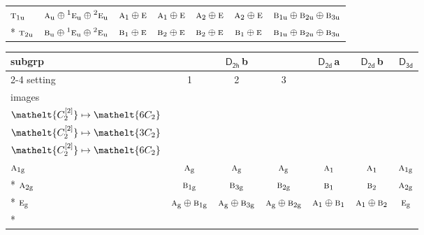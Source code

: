 \documentclass[10pt,a4paper]{article}
\numberwithin{equation}{section}
\newcommand{\eltfont}[1]{{\let\sigma\eltsigma\mathelt{#1}}}
\newcommand{\grp}[1]{\mathsf{#1}}
\newcommand{\irr}[1]{\text{\normalfont\scshape #1}}
\newcommand{\conjpair}[1]{{}^{#1}}
\newcommand{\cls}[1]{\eltfont{#1}}
\newcommand{\ptag}[1]{\mathrm{#1}}
\newcommand{\clsletter}[1]{\,{\scriptsize\color{black!55}#1}}
\newcommand{\genidx}[2]{#1^{[\mathrm{#2}]}}
\begin{document}
{\begin{longtable}{@{}lcccccc@{}}
$\irr{t}_{1\ptag{u}}$ & $\irr{a}_{\ptag{u}}\oplus \conjpair{1}\irr{e}_{\ptag{u}}\oplus \conjpair{2}\irr{e}_{\ptag{u}}$ & $\irr{a}_{1}\oplus \irr{e}$ & $\irr{a}_{1}\oplus \irr{e}$ & $\irr{a}_{2}\oplus \irr{e}$ & $\irr{a}_{2}\oplus \irr{e}$ & $\irr{b}_{1\ptag{u}}\oplus \irr{b}_{2\ptag{u}}\oplus \irr{b}_{3\ptag{u}}$\\*
$\irr{t}_{2\ptag{u}}$ & $\irr{b}_{\ptag{u}}\oplus \conjpair{1}\irr{e}_{\ptag{u}}\oplus \conjpair{2}\irr{e}_{\ptag{u}}$ & $\irr{b}_{1}\oplus \irr{e}$ & $\irr{b}_{2}\oplus \irr{e}$ & $\irr{b}_{2}\oplus \irr{e}$ & $\irr{b}_{1}\oplus \irr{e}$ & $\irr{b}_{1\ptag{u}}\oplus \irr{b}_{2\ptag{u}}\oplus \irr{b}_{3\ptag{u}}$\\
\bottomrule\end{longtable}}
{\small\begin{longtable}{@{}lcccccc@{}}\toprule
subgrp & \multicolumn{3}{c}{\href{D2h.pdf}{$\grp{D_{2h}}$}\clsletter{b}} & \href{D2d.pdf}{$\grp{D_{2d}}$}\clsletter{a} & \href{D2d.pdf}{$\grp{D_{2d}}$}\clsletter{b} & \href{D3d.pdf}{$\grp{D_{3d}}$}\\\cmidrule(lr){2-4}
setting & 1 & 2 & 3 &  &  & \\
images & {\scriptsize\begin{tabular}[t]{@{}c@{}}$\cls{\genidx{C_{2}}{1}} \mapsto \cls{3C_{2}}$\\$\cls{\genidx{C_{2}}{2}} \mapsto \cls{6C_{2}}$\end{tabular}} & {\scriptsize\begin{tabular}[t]{@{}c@{}}$\cls{\genidx{C_{2}}{1}} \mapsto \cls{6C_{2}}$\\$\cls{\genidx{C_{2}}{2}} \mapsto \cls{3C_{2}}$\end{tabular}} & {\scriptsize\begin{tabular}[t]{@{}c@{}}$\cls{\genidx{C_{2}}{1}} \mapsto \cls{6C_{2}}$\\$\cls{\genidx{C_{2}}{2}} \mapsto \cls{6C_{2}}$\end{tabular}} &  &  & \\\midrule\endhead
\bottomrule\endfoot\endlastfoot
$\irr{a}_{1\ptag{g}}$ & $\irr{a}_{\ptag{g}}$ & $\irr{a}_{\ptag{g}}$ & $\irr{a}_{\ptag{g}}$ & $\irr{a}_{1}$ & $\irr{a}_{1}$ & $\irr{a}_{1\ptag{g}}$\\*
$\irr{a}_{2\ptag{g}}$ & $\irr{b}_{1\ptag{g}}$ & $\irr{b}_{3\ptag{g}}$ & $\irr{b}_{2\ptag{g}}$ & $\irr{b}_{1}$ & $\irr{b}_{2}$ & $\irr{a}_{2\ptag{g}}$\\*
$\irr{e}_{\ptag{g}}$ & $\irr{a}_{\ptag{g}}\oplus \irr{b}_{1\ptag{g}}$ & $\irr{a}_{\ptag{g}}\oplus \irr{b}_{3\ptag{g}}$ & $\irr{a}_{\ptag{g}}\oplus \irr{b}_{2\ptag{g}}$ & $\irr{a}_{1}\oplus \irr{b}_{1}$ & $\irr{a}_{1}\oplus \irr{b}_{2}$ & $\irr{e}_{\ptag{g}}$\\*

\end{longtable}}
\end{document}
